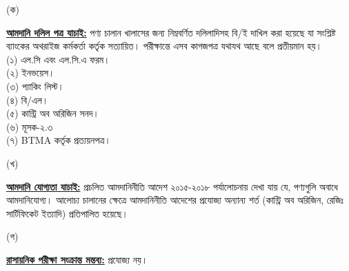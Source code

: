 \documentclass[12pt]{article}
\begin{document}
\begin{minipage}[t]{0.05\linewidth}
\hspace{1em}
\end{minipage}
\begin{minipage}[t]{0.05\linewidth}
(ক)
\end{minipage}
\begin{minipage}[t]{0.90\linewidth}
\underline{\textbf{আমদানি দলিল পত্র যাচাই:}}
পণ্য চালান খালাসের জন্য নিম্নবর্ণিত দলিলাদিসহ বি/ই দাখিল করা
হয়েছে যা সংশ্লিষ্ট ব্যাংকের অথরাইজ কর্মকর্তা কর্তৃক সত্যায়িত।
পরীক্ষান্তে এসব কাগজপত্র যথাযথ আছে বলে প্রতীয়মান হয়।
\\
(১) এল.সি এবং এল.সি.এ ফরম।
\\
(২) ইনভয়েস।
\\
(৩) প্যাকিং লিস্ট।
\\
(৪) বি/এল।
\\
(৫) কান্ট্রি অব অরিজিন সনদ।
\\
(৬) মূসক-২.৩
\\
(৭) BTMA কর্তৃক প্রত্যয়নপত্র।
\\
\end{minipage}
\begin{minipage}[t]{0.05\linewidth}
\hspace{1em}
\end{minipage}
\begin{minipage}[t]{0.05\linewidth}
(খ)
\end{minipage}
\begin{minipage}[t]{0.90\linewidth}
\underline{\textbf{আমদানি যোগ্যতা যাচাই:}}
প্রচলিত আমদানিনীতি আদেশ ২০১৫-২০১৮ পর্যালোচনায় দেখা যায় যে, পণ্যগুলি অবাধে আমদানিযোগ্য।
আলোচ্য চালানের ক্ষেত্রে আমদানিনীতি আদেশের প্রযোজ্য অন্যান্য শর্ত (কান্ট্রি অব অরিজিন, রেজিঃ
সার্টিফিকেট ইত্যাদি) প্রতিপালিত হয়েছে।
\\
\end{minipage}
\begin{minipage}[t]{0.05\linewidth}
\hspace{1em}
\end{minipage}
\begin{minipage}[t]{0.05\linewidth}
(গ)
\end{minipage}
\begin{minipage}[t]{0.90\linewidth}
\underline{\textbf{রাসায়নিক পরীক্ষা সংক্রান্ত মন্তব্য:}}
প্রযোজ্য নয়।
\\
\end{minipage}
\begin{minipage}[t]{0.05\linewidth}
\hspace{1em}
\end{minipage}
\end{document}
